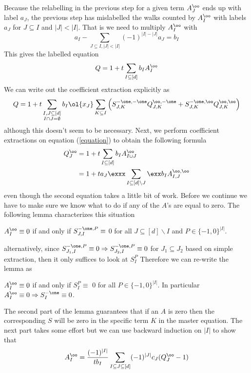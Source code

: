 Because the relabelling in the previous step for a given term $A_J^\oo$ ends up with label $a_J$, the previous step has mislabelled the walks counted by $A_I^\oo$ with labels $a_J$ for $J\subseteq I$ and $|J| < |I|$. That is we need to multiply $A_I^\oo$ with
\[
    a_I - \sum_{J\subseteq I,|J|<|I|}(-1)^{|I|-|J|}a_J = b_I
\]
This gives the labelled equation
\begin{align}\label{equation}
   Q = 1 + t \sum_{I\subseteq [d]}b_I A_I^{\oo}
\end{align}
We can write out the coefficient extraction explicitly as
\[
Q = 1  +t\sum_{\substack{I,J\subseteq[d]\\ I\cap J = \emptyset}}b_I\ol{x_J}\sum_{K\subseteq I}\left(S_{J,K}^{-\one,-\one}Q_{J,K}^{\oo,-\one}+S_{J,K}^{-\one,\oo}Q_{J,K}^{\oo,\oo}\right)
\]
although this doesn't seem to be necessary. Next, we perform coefficient extractions on equation (\ref{equation}) to obtain the following formula
\begin{align}
  Q_{J}^{\oo} &= 1 + t\sum_{I\subseteq [d]}b_I A_{I\cup J}^{\oo}\\
                        &= 1 + t a_J \exxx\sum_{I\subseteq[d]\backslash J}\exx b_I A_{I,J}^{\oo,\oo}
\end{align}
even though the second equation takes a little bit of work. Before we continue we have to make sure we know what to do if any of the $A$'s are equal to zero. The following lemma characterizes this situation
\begin{lemma} $A_{I}^{\oo} \equiv 0$ if and only if $S_{J,I}^{-\one,P} \equiv$ 0 for all $J \subseteq [d]\backslash I$ and $P \in \{-1,0\}^{|I|}$.
\end{lemma}
alternatively, since $S_{J_1,I}^{-\one,P} \equiv 0 \Rightarrow S_{J_2,I}^{-\one,P} \equiv 0$ for $J_1\subseteq J_2$ based on simple extraction, then it only suffices to look at $S_{I}^{P}$ Therefore we can re-write the lemma as
\begin{lemma} $A_{I}^{\oo} \equiv 0$ if and only if $S_{I}^{P} \equiv$ 0 for all $P \in \{-1,0\}^{|I|}$. In particular $A_I^{\oo} \equiv 0 \Rightarrow S_I^{-\one} \equiv 0 $.
\end{lemma}
The second part of the lemma guarantees that if an $A$ is zero then the corresponding $S$ will be zero in the specific term $K$ in the master equation. The next part takes some effort but we can use backward induction on $|I|$ to show that
\begin{align}
A_I^\oo = \frac{(-1)^{|I|}}{t b_I} \sum_{I\subseteq J \subseteq [d]}(-1)^{|J|} c_J (Q_J^\oo - 1)
\end{align}
